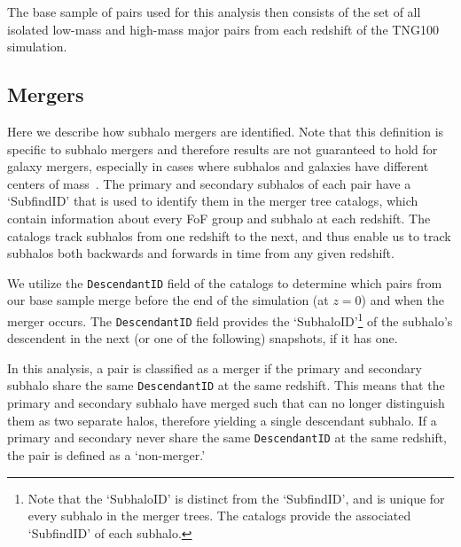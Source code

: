 \documentclass[twocolumn,linenumbers]{aastex631}
\begin{document}

The base sample of pairs used for this analysis then consists of the set of all
isolated 
low-mass and high-mass major pairs from each redshift of the TNG100 simulation. 

\subsection{Mergers} \label{subsec:mergers}
Here we describe how subhalo mergers are identified. 
Note that this definition is specific to subhalo mergers and therefore results are not guaranteed to hold for galaxy mergers, especially in cases where subhalos and galaxies have different centers of mass~\citep[see e.g.,]{RG2015}. %
The primary and secondary subhalos of each pair have a `SubfindID' that is used to identify them in the \subfind{} merger tree catalogs, which contain information about every FoF group and subhalo at each redshift. 
The \sublink{} catalogs track subhalos from one redshift to the next, and thus enable us to track subhalos both backwards and forwards in time from any given redshift. 

We utilize the \texttt{DescendantID} field of the \sublink{} catalogs to determine which pairs from our base sample merge before the end of the simulation (at $z=0$) and when the merger occurs. 
The \texttt{DescendantID} field provides the `SubhaloID'\footnote{Note that the `SubhaloID' is distinct from the `SubfindID', and is unique for every subhalo in the merger trees. 
The \sublink{} catalogs provide the associated `SubfindID' of each subhalo.} of the subhalo's descendent in the next (or one of the following) snapshots, if it has one. 

In this analysis, a pair is classified as a merger if the primary and secondary subhalo share the same \texttt{DescendantID} at the same redshift. 
This means that the primary and secondary subhalo have merged such that \subfind{} can no longer distinguish them as two separate halos, therefore yielding a single descendant subhalo.
If a primary and secondary never share the same \texttt{DescendantID} at the same redshift, the pair is defined as a `non-merger.'
\end{document}
